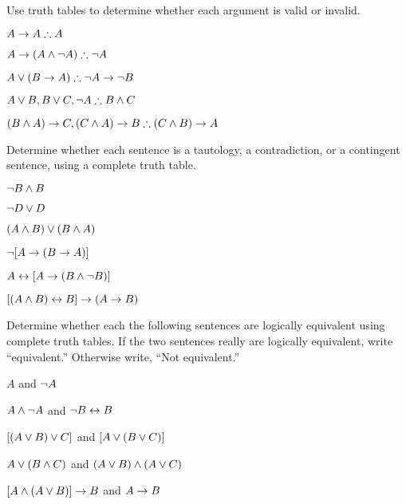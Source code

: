 \solutions
\problempart
\label{pr.TT.valid}
Use truth tables to determine whether each argument is valid or invalid.
\begin{compactlist}
\item $A\eif A \therefore A$ %
\item $A\eif(A\eand\enot A) \therefore \enot A$ %
\item $A\eor(B\eif A) \therefore \enot A \eif \enot B$ %
\item $A\eor B, B\eor C, \enot A \therefore B \eand C$ %
\item $(B\eand A)\eif C, (C\eand A)\eif B \therefore (C\eand B)\eif A$ %
\end{compactlist}

\problempart Determine whether each sentence is a tautology, a contradiction, or a contingent sentence, using a complete truth table.
\begin{compactlist}
\item $\neg B \wedge B$ \vspace{.5ex}%


\item $\neg D \vee D$ \vspace{.5ex}%


\item $(A\wedge B) \vee (B\wedge A)$\vspace{.5ex} %


\item $\neg[A \rightarrow (B \rightarrow A)]$\vspace{.5ex} %


\item $A \leftrightarrow [A \rightarrow (B \wedge \neg B)]$ \vspace{.5ex}%


\item $[(A \wedge B) \leftrightarrow B] \rightarrow (A \rightarrow B)$ \vspace{.5ex}%

\end{compactlist}



\noindent\problempart
\label{pr.TT.equiv}
Determine whether each the following sentences are logically equivalent using complete truth tables. If the two sentences really are logically equivalent, write ``equivalent.'' Otherwise write, ``Not equivalent.'' 
\begin{compactlist}
\item $A$ and $\neg A$
\item $A \wedge \neg A$ and $\neg B \leftrightarrow B$
\item $[(A \vee B) \vee C]$ and $[A \vee (B \vee C)]$
\item $A \vee (B \wedge C)$ and $(A \vee B) \wedge (A \vee C)$
\item $[A \wedge (A \vee B)] \rightarrow B$ and $A \rightarrow B$\end{compactlist}


